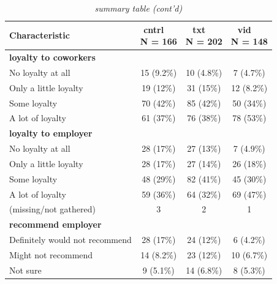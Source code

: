 \documentclass[
  11pt,
  oneside]{article}
\begin{document}
\begin{table}

\caption{\label{tab:tab-sum-w}\textit{summary table (cont'd)}}
\centering
\begin{tabular}[t]{l|c|c|c}
\hline
\textbf{Characteristic} & \makecell[c]{\textbf{cntrl}\ \ \\N = 166} & \makecell[c]{\textbf{txt}\ \ \\N = 202} & \makecell[c]{\textbf{vid}\ \ \\N = 148}\\
\hline
\textbf{loyalty to coworkers} &  &  & \\
\hline
\hspace{1em}No loyalty at all & 15 (9.2\%) & 10 (4.8\%) & 7 (4.7\%)\\
\hline
\hspace{1em}Only a little loyalty & 19 (12\%) & 31 (15\%) & 12 (8.2\%)\\
\hline
\hspace{1em}Some loyalty & 70 (42\%) & 85 (42\%) & 50 (34\%)\\
\hline
\hspace{1em}A lot of loyalty & 61 (37\%) & 76 (38\%) & 78 (53\%)\\
\hline
\textbf{loyalty to employer} &  &  & \\
\hline
\hspace{1em}No loyalty at all & 28 (17\%) & 27 (13\%) & 7 (4.9\%)\\
\hline
\hspace{1em}Only a little loyalty & 28 (17\%) & 27 (14\%) & 26 (18\%)\\
\hline
\hspace{1em}Some loyalty & 48 (29\%) & 82 (41\%) & 45 (30\%)\\
\hline
\hspace{1em}A lot of loyalty & 59 (36\%) & 64 (32\%) & 69 (47\%)\\
\hline
\hspace{1em}(missing/not gathered) & 3 & 2 & 1\\
\hline
\textbf{recommend employer} &  &  & \\
\hline
\hspace{1em}Definitely would not recommend & 28 (17\%) & 24 (12\%) & 6 (4.2\%)\\
\hline
\hspace{1em}Might not recommend & 14 (8.2\%) & 23 (12\%) & 10 (6.7\%)\\
\hline
\hspace{1em}Not sure & 9 (5.1\%) & 14 (6.8\%) & 8 (5.3\%)\\

\end{tabular}
\end{table}
\end{document}

